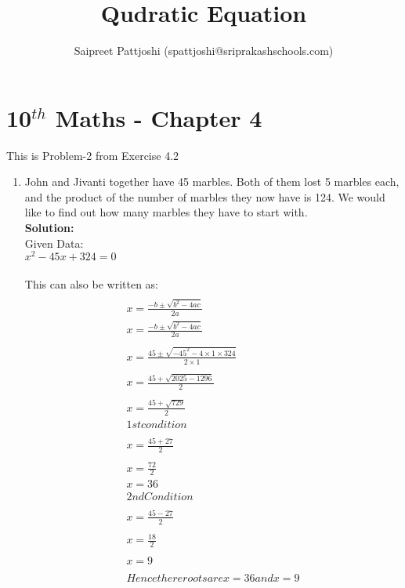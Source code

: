 \documentclass[12pt]{article}
\title{Qudratic Equation}
\author{Saipreet Pattjoshi (spattjoshi@sriprakashschools.com)}
\newcommand{\solution}{\noindent \textbf{Solution: }}
\begin{document}
\maketitle
\section*{10$^{th}$ Maths - Chapter 4}
This is Problem-2 from Exercise 4.2
\begin{enumerate}
\item John and Jivanti together have 45 marbles. Both of them lost 5 marbles each, and the product of the number of marbles they now have is 124. We would like to find out how many marbles they have to start with. \\
\solution \\
Given Data:
\\${x^2-45x+324=0}$\\
\\This can also be written as:
\begin{align}
\\{x=\frac{-b\pm\sqrt{b^2-4ac}}{2a}}
\\x=\frac{-b\pm\sqrt{b^2-4ac}}{2a}\\
\\{x=\frac{45\pm\sqrt{-45^2-4 \times 1\times324}}{2 \times 1}}\\
\\{x=\frac{45+\sqrt{2025-1296}}{2}}\\
\\{x=\frac{45+\sqrt{729}}{2}}
\\1st condition\\
\\{x=\frac{45+27}{2}}\\
\\{x=\frac{72}{2}}\\
x=36
\\2nd Condition\\
\\{x=\frac{45-27}{2}}\\
\\{x=\frac{18}{2}}\\
\\x=9\\
\\ Hence there roots are x=36 and x=9\\
\end{align}
	

\end{enumerate}
\end{document}
